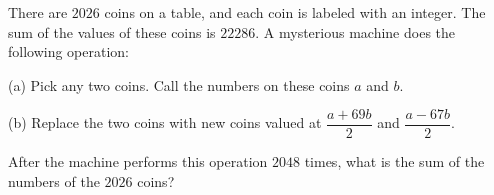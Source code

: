 There are $2026$ coins on a table, and each coin is labeled with an integer. The sum of the values of these coins is $22286$. A mysterious machine does the following operation:

(a) Pick any two coins. Call the numbers on these coins $a$ and $b$.

(b) Replace the two coins with new coins valued at $\dfrac{a+69b}{2}$ and $\dfrac{a-67b}{2}$.

After the machine performs this operation $2048$ times, what is the sum of the numbers of the $2026$ coins?
